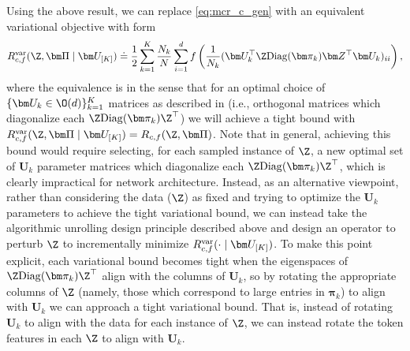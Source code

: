 \documentclass[../../book-main.tex]{subfiles}
\begin{document}
Using the above result, we can replace \eqref{eq:mcr_c_gen} with an equivalent variational objective with form
\vspace{-2mm}
\begin{equation}
    \label{eq:var_comp}
    R^{\rm var}_{c,f} (\Z,\bm \Pi \mid \bm U_{[K]}) \doteq \frac{1}{2}\sum_{k=1}^K \frac{N_k}{N} \sum_{i=1}^{d} f\left(\frac{1}{N_k} (\bm U_{k}^{\top} \Z \mathrm{Diag}(\bm \pi_k) \bm Z^{\top} \bm U_{k})_{ii} \right),
\end{equation}
where the equivalence is in the sense that for an optimal choice of $\{ \bm U_k \in \O(d)\}_{k=1}^K$ matrices as described in  (i.e., orthogonal matrices which diagonalize each $\Z \mathrm{Diag}(\bm \pi_k) \Z^\top $) we will achieve a tight bound with $ R^{\rm var}_{c,f} (\Z,\bm \Pi \mid \bm U_{[K]}) = R_{c,f} (\Z,\bm \Pi)$. Note that in general, achieving this bound would require selecting, for each sampled instance of $\Z$, a new optimal set of $\bm U_{k}$ parameter matrices which diagonalize each $\Z\mathrm{Diag}(\bm \pi_{k})\Z^{\top}$, which is clearly impractical for network architecture. 
Instead, as an alternative viewpoint, rather than considering the data ($\Z$) as fixed and trying to optimize the $\bm U_k$ parameters to achieve the tight variational bound, we can instead take the algorithmic unrolling design principle described above and design an operator to perturb $\Z$ to incrementally minimize $R_{c, f}^{\rm var}(\cdot \mid \bm U_{[K]})$.  To make this point explicit, each variational bound becomes tight when the eigenspaces of $\Z \mathrm{Diag}(\bm \pi_k) \Z
^\top$ align with the columns of $\bm U_k$, so by rotating the appropriate columns of $\Z$ (namely, those which correspond to large entries in $\bm \pi_k$) to align with $\bm U_k$ we can approach a tight variational bound. That is, instead of rotating $\bm U_k$ to align with the data for each instance of $\Z$, we can instead rotate the token features in each $\Z$ to align with $\bm U_k$. 
\end{document}
